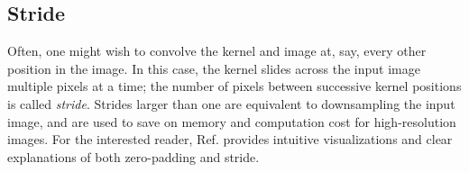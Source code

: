 \documentclass[11pt, a4paper]{article}
\begin{document}


\subsection{Stride}
Often, one might wish to convolve the kernel and image at, say, every other position in the image. In this case, the kernel slides across the input image multiple pixels at a time; the number of pixels between successive kernel positions is called \textit{stride}. Strides larger than one are equivalent to downsampling the input image, and are used to save on memory and computation cost for high-resolution images. For the interested reader, Ref. \cite{cnn-guide} provides intuitive visualizations and clear explanations of both zero-padding and stride.
\end{document}

